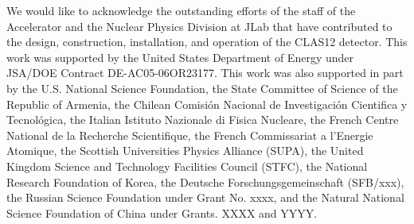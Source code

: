 \documentclass[final,3p,twocolumn]{elsarticle}
\begin{document}
\vspace{0,5cm}


\vspace{0.3cm}

We would like to acknowledge the outstanding efforts of the staff of the Accelerator and the Nuclear Physics Division at
JLab that have contributed to the design, construction, installation, and operation of the CLAS12 detector. This work was
supported by the United States Department of Energy under JSA/DOE Contract DE-AC05-06OR23177. This work was also
supported in part by the U.S. National Science Foundation, the State Committee of Science of the Republic of Armenia, the
Chilean Comisi\'on Nacional de Investigaci\'on Cientifica y Tecnol\'ogica, the Italian Istituto Nazionale di Fisica Nucleare,
the French Centre National de la Recherche Scientifique, the French Commissariat a l'Energie Atomique, the Scottish
Universities Physics Alliance (SUPA), the United Kingdom Science and Technology Facilities Council (STFC), the National
Research Foundation of Korea, the Deutsche Forschungsgemeinschaft (SFB/xxx), the Russian Science Foundation under
Grant No. xxxx, and the Natural National Science Foundation of China under Grants. XXXX and YYYY. 

\end{document}

